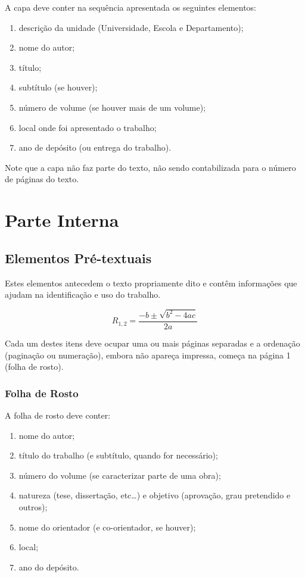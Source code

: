 \documentclass[repeatfields,xlists,xpacks,oneside]{ufrgscca}
\begin{document}
A capa deve conter na sequência apresentada os seguintes elementos:

\begin{enumerate}
\item descrição da unidade (Universidade, Escola e Departamento);
\item nome do autor;
\item título;
\item subtítulo (se houver);
\item número de volume (se houver mais de um volume);
\item local onde foi apresentado o trabalho;
\item ano de depósito (ou entrega do trabalho).
\end{enumerate}

Note que a capa não faz parte do texto, não sendo contabilizada para o número de páginas do texto.

\section{Parte Interna}

\subsection{Elementos Pré-textuais}

Estes elementos antecedem o texto propriamente dito e contêm informações que
ajudam na identificação e uso do trabalho.

\begin{equation}
    R_{1,2}=\frac{-b\pm\sqrt{b^2-4ac}}{2a}
\end{equation}



Cada um destes itens deve ocupar uma ou mais páginas separadas e a ordenação
(paginação ou numeração), embora não apareça impressa, começa na página 1
(folha de rosto).


\subsubsection{Folha de Rosto}

A folha de rosto deve conter:

\begin{enumerate}
\item nome do autor;
\item título do trabalho (e subtítulo, quando for necessário);
\item número do volume (se caracterizar parte de uma obra);
\item natureza (tese, dissertação, etc\ldots) e objetivo (aprovação, grau pretendido e outros);
\item nome do orientador (e co-orientador, se houver);
\item local;
\item ano do depósito.
\end{enumerate}
\end{document}
